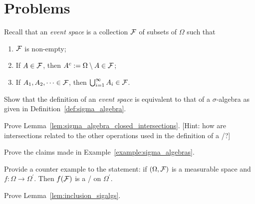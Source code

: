 \section{Problems}

\begin{problem}\label{prb:event_space_are_sigma_algebras}
Recall that an \emph{event space} is a collection $\mathcal F$ of subsets of $\Omega$ such that
\begin{enumerate}[label=(\alph*)]
\item $\mathcal F$ is non-empty;
\item If $A \in \mathcal F$, then $A^c := \Omega \setminus A \in \mathcal F$;
\item If $A_1, A_2, \dots \in \mathcal F$, then $\bigcup_{i = 1}^\infty A_i \in \mathcal F$.
\end{enumerate}
Show that the definition of an \emph{event space} is equivalent to that of a $\sigma$-algebra as given in Definition~\ref{def:sigma_algebra}.
\end{problem}

\begin{problem}\label{prb:sigma_algebra_closed_intersections}
Prove Lemma~\ref{lem:sigma_algebra_closed_intersections}. [Hint: how are intersections related to the other operations used in the definition of a \sigalg/?]
\end{problem}

\begin{problem}\label{prb:example_sigalgs}
Prove the claims made in Example~\ref{example:sigma_algebras}.
\end{problem}



\begin{problem}\label{prb:converse_preimage_sigma_algebra}
Provide a counter example to the statement: if $(\Omega, \mathcal F)$ is a measurable space and $f : \Omega \to \Omega^\prime$. Then $f(\mathcal F)$ is a \sigalg/ on $\Omega^\prime$.
\end{problem}

\begin{problem}\label{prb:inclusion_sigalgs}
Prove Lemma~\ref{lem:inclusion_sigalgs}.
\end{problem}



